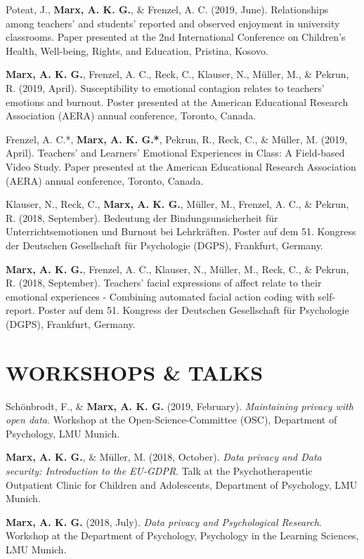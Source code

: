\documentclass[letterpaper]{article}
\renewenvironment{itemize}{ %
  \begin{list}{}{ %
    \setlength{\leftmargin}{2.5em} %
  }
}{
  \end{list}
}
\begin{document}
\begin{itemize}
\item Poteat, J., {\bf Marx, A. K. G.}, \& Frenzel, A. C. (2019, June). Relationships among teachers' and students' reported and observed enjoyment in university classrooms. Paper presented at the 2nd International Conference on Children's Health, Well-being, Rights, and Education, Pristina, Kosovo.
\item {\bf Marx, A. K. G.}, Frenzel, A. C., Reck, C., Klauser, N., Müller, M., \& Pekrun, R. (2019, April). Susceptibility to emotional contagion relates to teachers' emotions and burnout. Poster presented at the American Educational Research Association (AERA) annual conference, Toronto, Canada.
\item Frenzel, A. C.*, {\bf Marx, A. K. G.*}, Pekrun, R., Reck, C., \& Müller, M. (2019, April). Teachers’ and Learners’ Emotional Experiences in Class: A Field-based Video Study. Paper presented at the American Educational Research Association (AERA) annual conference, Toronto, Canada.
\item Klauser, N., Reck, C., {\bf Marx, A. K. G.}, Müller, M., Frenzel, A. C., \& Pekrun, R. (2018, September). Bedeutung der Bindungsunsicherheit für Unterrichtsemotionen und Burnout bei Lehrkräften. Poster auf dem 51. Kongress der Deutschen Gesellschaft für Psychologie (DGPS), Frankfurt, Germany.
\item {\bf Marx, A. K. G.}, Frenzel, A. C., Klauser, N., Müller, M., Reck, C., \& Pekrun, R. (2018, September). Teachers' facial expressions of affect relate to their emotional experiences - Combining automated facial action coding with self-report. Poster auf dem 51. Kongress der Deutschen Gesellschaft für Psychologie (DGPS), Frankfurt, Germany.
\item{}
\end{itemize}


\section*{WORKSHOPS \& TALKS}
\begin{itemize}
\item Schönbrodt, F., \& {\bf Marx, A. K. G.} (2019, February). {\it Maintaining privacy with open data}. Workshop at the Open-Science-Committee (OSC), Department of Psychology, LMU Munich.
\item {\bf Marx, A. K. G.}, \& Müller, M. (2018, October). {\it Data privacy and Data security: Introduction to the EU-GDPR}. Talk at the Psychotherapeutic Outpatient Clinic for Children and Adolescents, Department of Psychology, LMU Munich.
\item {\bf Marx, A. K. G.} (2018, July). {\it Data privacy and Psychological Research}. Workshop at the Department of Psychology, Psychology in the Learning Sciences, LMU Munich.
\end{itemize}
\end{document}
